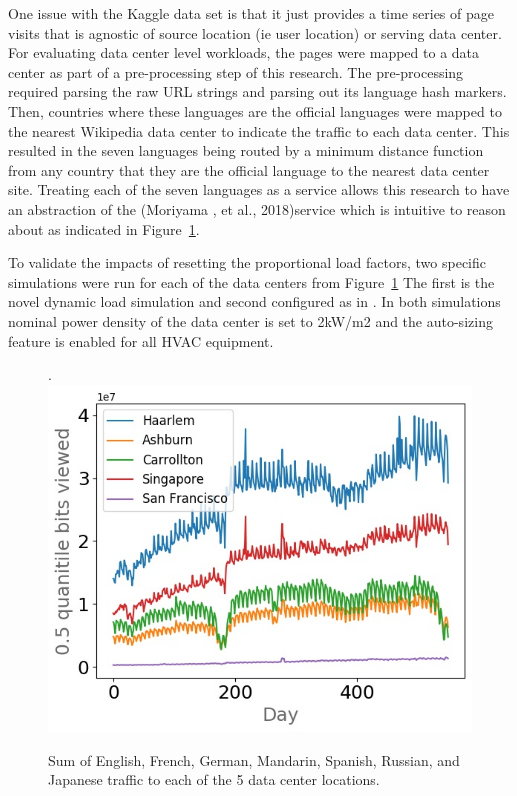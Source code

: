 \documentclass[twocolumn, a4paper,10pt]{article}
\begin{document}
One issue with the Kaggle data set is that it just provides a time series of page visits that is agnostic of source location (ie user location) or serving data center. For evaluating data center level workloads, the pages were mapped to a data center as part of a pre-processing step of this research. The pre-processing required parsing the raw URL strings and parsing out it\textsc{}s language hash markers. Then, countries where these languages are the official languages were mapped to the nearest Wikipedia data center to indicate the traffic to each data center.  This resulted in the seven languages being routed by a minimum distance function from any country that they are the official language to the nearest data center site. Treating each of the seven languages as a service allows this research to have an abstraction of the (Moriyama , et al., 2018)service which is intuitive to reason about as indicated in Figure~\ref{fig:lang2dc}. 

To validate the impacts of resetting the proportional load factors, two specific simulations were run for each of the data centers from Figure~\ref{fig:lang2dc} The first is the novel dynamic load simulation and second configured as in \citep{moriyama18}. In both simulations nominal power density of the data center is set to 2kW/m2 and the auto-sizing feature is enabled for all HVAC equipment. 

\begin{figure}.
\centering
\includegraphics[scale=0.45]{img/lang2dc_curve.jpg}
\caption{Sum of English, French, German, Mandarin, Spanish, Russian, and Japanese traffic to each of the 5 data center locations.}
\label{fig:lang2dc}
\end{figure}
\end{document}
